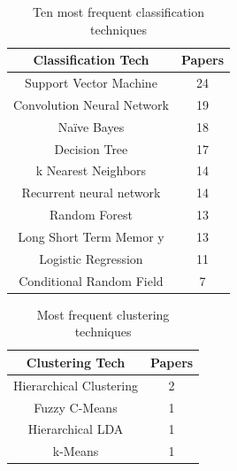 \begin{table}[H]
\centering
\footnotesize
\caption{Ten most frequent classification techniques}
\label{tab:rsl_freq_classification}
\begin{tabular}{@{}cc@{}}
\toprule
\textbf{Classification Tech} & \textbf{Papers} \\ \midrule
Support Vector Machine       & 24              \\
Convolution Neural Network   & 19              \\
Naïve Bayes                  & 18              \\
Decision Tree                & 17              \\
k Nearest Neighbors          & 14              \\
Recurrent neural network     & 14              \\
Random Forest                & 13              \\
Long Short Term Memor y      & 13              \\
Logistic Regression          & 11              \\
Conditional Random Field     & 7               \\ \bottomrule
\end{tabular}
\end{table}


\begin{table}[H]
\centering
\caption{Most frequent clustering techniques}
\label{tab:rsl_freq_clustering}
\footnotesize
\begin{tabular}{cc}
\hline
\textbf{Clustering Tech} & \textbf{Papers} \\ \hline
Hierarchical Clustering  & 2               \\
Fuzzy C-Means            & 1               \\
Hierarchical LDA         & 1               \\
k-Means                  & 1              \\
\bottomrule
\end{tabular}
\end{table}

